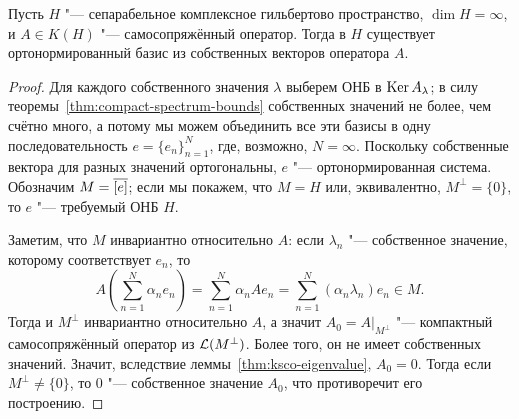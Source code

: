 \documentclass[main]{subfiles}
\begin{document}
\begin{theorem}
  Пусть \( H \) "--- сепарабельное комплексное гильбертово пространство,
  \( \dim H = \infty \), и
  \( A \in K(H) \) "--- самосопряжённый оператор.
  Тогда в \( H \) существует ортонормированный базис
  из собственных векторов оператора \( A \).
\end{theorem}
\begin{proof}
  Для каждого собственного значения \( \lambda \)
  выберем ОНБ в \( \operatorname{Ker} A_\lambda \);
  в силу теоремы~\ref{thm:compact-spectrum-bounds}
  собственных значений не более, чем счётно много,
  а потому мы можем объединить все эти базисы
  в одну последовательность \( e = \{ e_n \}_{n=1}^N \),
  где, возможно, \( N = \infty \).
  Поскольку собственные вектора для разных значений
  ортогональны, \( e \) "--- ортонормированная система.
  Обозначим \( M = \overline{[e]} \);
  если мы покажем, что \( M = H \) или,
  эквивалентно, \( M^\perp = \{ 0 \} \),
  то \( e \) "--- требуемый ОНБ \( H \).

  Заметим, что \( M \) инвариантно относительно \( A \):
  если \( \lambda_n \) "--- собственное значение,
  которому соответствует \( e_n \), то
  \[
    A (\sum_{n=1}^N \alpha_n e_n) =
    \sum_{n=1}^N \alpha_n A e_n =
    \sum_{n=1}^N (\alpha_n \lambda_n) e_n \in M.
  \]
  Тогда и \( M^\perp \) инвариантно относительно \( A \),
  а значит \( A_0 = A \bigr|_{M^\perp} \) "---
  компактный самосопряжённый оператор из \( \Linears{M^\perp} \).
  Более того, он не имеет собственных значений.
  Значит, вследствие леммы~\ref{thm:ksco-eigenvalue},
  \( A_0 = 0 \).
  Тогда если \( M^\perp \ne \{ 0 \} \), то \( 0 \) "---
  собственное значение \( A_0 \),
  что противоречит его построению.
\end{proof}

\end{document}
